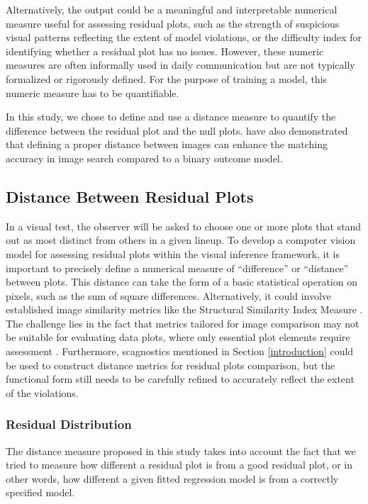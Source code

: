 \documentclass[]{interact}
\theoremstyle{plain}%
\theoremstyle{definition}
\theoremstyle{remark}
\begin{document}
Alternatively, the output could be a meaningful and interpretable
numerical measure useful for assessing residual plots, such as the
strength of suspicious visual patterns reflecting the extent of model
violations, or the difficulty index for identifying whether a residual
plot has no issues. However, these numeric measures are often informally
used in daily communication but are not typically formalized or
rigorously defined. For the purpose of training a model, this numeric
measure has to be quantifiable.

In this study, we chose to define and use a distance measure to quantify
the difference between the residual plot and the null plots.
\citet{vo2016localizing} have also demonstrated that defining a proper
distance between images can enhance the matching accuracy in image
search compared to a binary outcome model.

\subsection{Distance Between Residual
Plots}\label{distance-between-residual-plots}

In a visual test, the observer will be asked to choose one or more plots
that stand out as most distinct from others in a given lineup. To
develop a computer vision model for assessing residual plots within the
visual inference framework, it is important to precisely define a
numerical measure of ``difference'' or ``distance'' between plots. This
distance can take the form of a basic statistical operation on pixels,
such as the sum of square differences. Alternatively, it could involve
established image similarity metrics like the Structural Similarity
Index Measure \citep{wang2004image}. The challenge lies in the fact that
metrics tailored for image comparison may not be suitable for evaluating
data plots, where only essential plot elements require assessment
\citep{chowdhury2018measuring}. Furthermore, scagnostics mentioned in
Section \ref{introduction} could be used to construct distance metrics
for residual plots comparison, but the functional form still needs to be
carefully refined to accurately reflect the extent of the violations.

\subsubsection{Residual Distribution}\label{residual-distribution}

The distance measure proposed in this study takes into account the fact
that we tried to measure how different a residual plot is from a good
residual plot, or in other words, how different a given fitted
regression model is from a correctly specified model.
\end{document}
